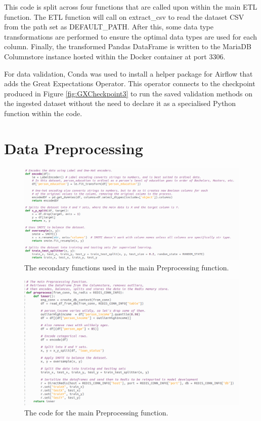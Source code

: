 \documentclass[12pt]{report}
\newcommand{\para}{\vspace{7pt}\noindent}
\begin{document}
\para This code is split across four functions that are called upon within the main 
ETL function. The ETL function will call on extract\_csv to read the dataset CSV from 
the path set as DEFAULT\_PATH. After this, some data type transformations are performed 
to ensure the optimal data types are used for each column. Finally, the transformed 
Pandas DataFrame is written to the MariaDB Columnstore instance hosted within the Docker 
container at port 3306.

\para For data validation,
Conda was used to install a helper package for Airflow that adds the Great Expectations Operator.
This operator connects to the checkpoint produced in Figure \ref{fig:GXCheckpoint3} to run the saved validation 
methods on the ingested dataset without the need to declare it as a specialised Python function within 
the code. 

\section{Data Preprocessing}\label{sec:ImpPreprocessing}

\begin{figure}[H]
    \centering
    \includegraphics[width=\linewidth]{Implementation/.Code/PipelineFunctions/Preprocessing1.png}
    \caption{The secondary functions used in the main Preprocessing function.}
    \label{fig:PreprocessingCode1}
\end{figure}

\begin{figure}[H]
    \centering
    \includegraphics[width=\linewidth]{Implementation/.Code/PipelineFunctions/Preprocessing2.png}
    \caption{The code for the main Preprocessing function.}
    \label{fig:PreprocessingCode2}
\end{figure}
\end{document}
